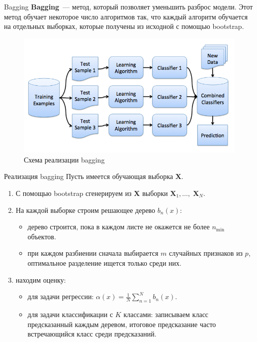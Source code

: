\documentclass[notheorems, handout]{beamer}
\begin{document}
\begin{frame}{Bagging}
  \textbf{Bagging}~--- метод, который позволяет уменьшить разброс
  модели. Этот метод обучает некоторое число алгоритмов так, что
  каждый алгоритм обучается на отдельных выборках, которые получены
  из исходной с помощью bootstrap.
  \begin{figure}[h!]
    \includegraphics[width=0.9 \textwidth]{img/bagging}
    \caption{Схема реализации bagging}
  \end{figure}

\end{frame}

\begin{frame}{Реализация bagging}
  Пусть имеется обучающая выборка $\mathbf{X}$.
  \begin{enumerate}
    \item С помощью bootstrap сгенерируем из $\mathbf{X}$ выборки
      $\mathbf{X}_{1}, \dots,\; \mathbf{X}_{N}$.
    \item На каждой выборке строим решающее дерево $b_{n}(x)$:
      \begin{itemize}
        \item дерево строится, пока в каждом листе не окажется не
          более $n_{\min}$ объектов.
        \item при каждом разбиении сначала выбирается $m$ случайных
          признаков из $p$, оптимальное разделение ищется только среди них.
      \end{itemize}
    \item находим оценку:
      \begin{itemize}
        \item для задачи регрессии: $\alpha(x) =
          \frac{1}{N}\displaystyle\sum_{n = 1}^{N} b_{n}(x)$.
        \item для задачи классификации с $K$ классами: записываем
          класс предсказанный каждым деревом, итоговое предсказание
          часто встречающийся класс среди предсказаний.
      \end{itemize}
  \end{enumerate}
\end{frame}
\end{document}
